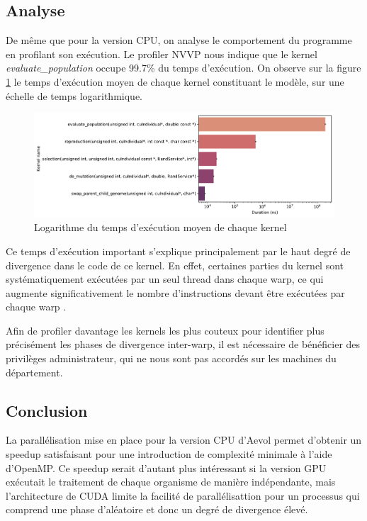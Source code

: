 \documentclass[a4paper, 10pt, twoside]{article}
\begin{document}
\subsection{Analyse}

De même que pour la version CPU, on analyse le comportement du programme en profilant son exécution. Le profiler NVVP nous indique que le kernel \textit{evaluate\_population} occupe 99.7\% du temps d'exécution. On observe sur la figure \ref{fig:kernel/timings} le temps d'exécution moyen de chaque kernel constituant le modèle, sur une échelle de temps logarithmique.

\begin{figure}[htp]
	\centering
	\includegraphics[width=0.7\linewidth]{img/kernel_timings.pdf}
	\caption{Logarithme du temps d'exécution moyen de chaque kernel}
	\label{fig:kernel/timings}
\end{figure}

Ce temps d'exécution important s'explique principalement par le haut degré de divergence dans le code de ce kernel. En effet, certaines parties du kernel sont systématiquement exécutées par un seul thread dans chaque warp, ce qui augmente significativement le nombre d'instructions devant être exécutées par chaque warp \cite{nvidia/branching}.

Afin de profiler davantage les kernels les plus couteux pour identifier plus précisément les phases de divergence inter-warp, il est nécessaire de bénéficier des privilèges administrateur, qui ne nous sont pas accordés sur les machines du département.

\subsection{Conclusion}

La parallélisation mise en place pour la version CPU d'Aevol permet d'obtenir un speedup satisfaisant pour une introduction de complexité minimale à l'aide d'OpenMP. Ce speedup serait d'autant plus intéressant si la version GPU exécutait le traitement de chaque organisme de manière indépendante, mais l'architecture de CUDA limite la facilité de parallélisattion pour un processus qui comprend une phase d'aléatoire et donc un degré de divergence élevé.



\end{document}
